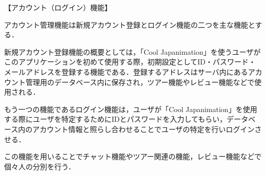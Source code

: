 【アカウント（ログイン）機能】
\par アカウント管理機能は新規アカウント登録とログイン機能の二つを主な機能とする．
\par 新規アカウント登録機能の概要としては，「Cool Japanimation」を使うユーザがこのアプリケーションを初めて使用する際，初期設定としてID・パスワード・メールアドレスを登録する機能である．登録するアドレスはサーバ内にあるアカウント管理用のデータベース内に保存され，ツアー機能やレビュー機能などで使用される．
\par もう一つの機能であるログイン機能は，ユーザが「Cool Japanimation」を使用する際にユーザを特定するためにIDとパスワードを入力してもらい，データベース内のアカウント情報と照らし合わせることでユーザの特定を行いログインさせる．
\par この機能を用いることでチャット機能やツアー関連の機能，レビュー機能などで個々人の分別を行う．
